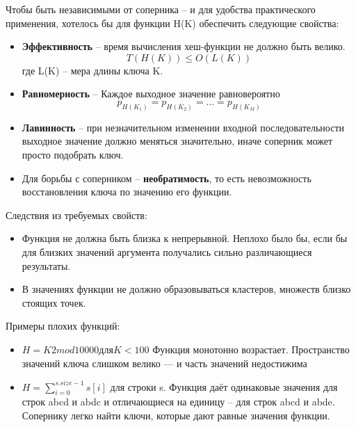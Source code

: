 \documentclass{beamer}
\begin{document}
\begin{frame}[t]
    Чтобы быть независимыми от соперника -- и для удобства практического применения, хотелось бы для функции H(K) обеспечить следующие свойства:

	\begin{itemize}
	    \item \textbf{Эффективность} -- время вычисления хеш-функции не должно быть велико.
	    \[T(H(K)) \leq O(L(K))\]
	    где L(K) -- мера длины ключа K. 
	    \item \textbf{Равномерность} -- Каждое выходное значение равновероятно
	    \[p_{H(K_1)}=p_{H(K_2)} = \dots = p_{H(K_M)}\]
	    \item \textbf{Лавинность} -- при незначительном изменении входной последовательности выходное значение должно меняться значительно, иначе соперник может просто подобрать ключ.
	    \item Для борьбы с соперником -- \textbf{необратимость}, то есть невозможность восстановления ключа по значению его функции.
	\end{itemize}
\end{frame}

\begin{frame}[t]
    Следствия из требуемых свойств:

	\begin{itemize}
	    \item Функция не должна быть близка к непрерывной. Неплохо было бы, если бы для близких значений аргумента получались сильно различающиеся результаты.
	    \item В значениях функции не должно образовываться кластеров, множеств близко стоящих точек.
	\end{itemize}
	Примеры плохих функций:
	\begin{itemize}
	    \item $H = K2 mod 10000 для K < 100$
	    Функция монотонно возрастает. Пространство значений ключа слишком велико — и часть значений недостижима
	    \item $H =  \sum_{i=0}^{s.size-1} s[i]$ для строки s.
	    Функция даёт одинаковые значения для строк abcd и abdc и отличающиеся на единицу -- для строк abcd и abde. Сопернику легко найти
ключи, которые дают равные значения функции.
	\end{itemize}
\end{frame}
\end{document}
